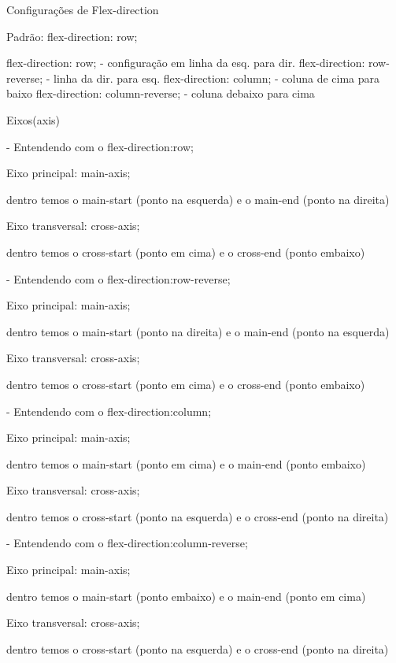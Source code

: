 Configurações de Flex-direction

Padrão: flex-direction: row;

flex-direction: row; - configuração em linha da esq. para dir.
flex-direction: row-reverse; - linha da dir. para esq.
flex-direction: column; - coluna de cima para baixo
flex-direction: column-reverse; - coluna debaixo para cima

Eixos(axis)

- Entendendo com o flex-direction:row;

Eixo principal: main-axis;

dentro temos o main-start (ponto na esquerda) e o main-end (ponto na direita)

Eixo transversal: cross-axis; 

dentro temos o cross-start (ponto em cima) e o cross-end (ponto embaixo)

- Entendendo com o flex-direction:row-reverse;

Eixo principal: main-axis;

dentro temos o main-start (ponto na direita) e o main-end (ponto na esquerda)

Eixo transversal: cross-axis; 

dentro temos o cross-start (ponto em cima) e o cross-end (ponto embaixo)


- Entendendo com o flex-direction:column;

Eixo principal: main-axis;

dentro temos o main-start (ponto em cima) e o main-end (ponto embaixo)

Eixo transversal: cross-axis; 

dentro temos o cross-start (ponto na esquerda) e o cross-end (ponto na direita)


- Entendendo com o flex-direction:column-reverse;

Eixo principal: main-axis;

dentro temos o main-start (ponto embaixo) e o main-end (ponto em cima)

Eixo transversal: cross-axis; 

dentro temos o cross-start (ponto na esquerda) e o cross-end (ponto na direita)